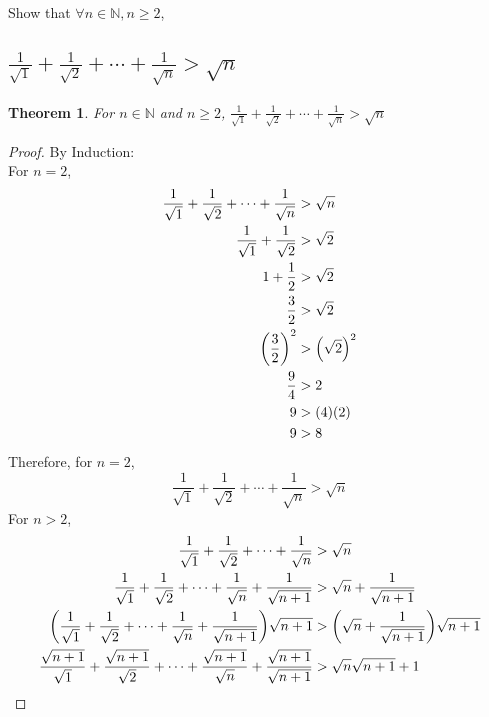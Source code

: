 \documentclass[]{article}
\newcommand{\N}{\mathbb{N}}
\newtheorem{theorem}{Theorem}
\begin{document}
\newpage
\section{}
Show that $\forall n \in \N, n \geq 2$,

\subsection{
    $\frac{1}{\sqrt{1}} + \frac{1}{\sqrt{2}} + \cdots + \frac{1}{\sqrt{n}} > \sqrt{n}$
}
\begin{theorem}
    For $n \in \N$ and $n \geq 2$,
    $\frac{1}{\sqrt{1}} + \frac{1}{\sqrt{2}} + \cdots + \frac{1}{\sqrt{n}} > \sqrt{n}$
\end{theorem}
\begin{proof}
    By Induction:\\
    For $n=2$,
    \begin{align*}
        \frac{1}{\sqrt{1}} + \frac{1}{\sqrt{2}} + \cdots + \frac{1}{\sqrt{n}} &> \sqrt{n}\\
        \frac{1}{\sqrt{1}} + \frac{1}{\sqrt{2}} &> \sqrt{2}\\
        1 + \frac{1}{2} &> \sqrt{2}\\
        \frac{3}{2} &> \sqrt{2}\\
        \qty(\frac{3}{2})^2 &> \qty(\sqrt{2})^2\\
        \frac{9}{4} &> 2\\
        9 &> (4)(2)\\
        9 &> 8 
    \end{align*}
    Therefore, for $n=2$,
    $$\frac{1}{\sqrt{1}} + \frac{1}{\sqrt{2}} + \cdots + \frac{1}{\sqrt{n}} > \sqrt{n}$$
    For $n>2$,
    \begin{align*}
        \frac{1}{\sqrt{1}} + \frac{1}{\sqrt{2}} + \cdots + \frac{1}{\sqrt{n}} 
            &> \sqrt{n}\\
        \frac{1}{\sqrt{1}} + \frac{1}{\sqrt{2}} + \cdots +
            \frac{1}{\sqrt{n}} + \frac{1}{\sqrt{n+1}}
            &> \sqrt{n} + \frac{1}{\sqrt{n+1}}\\
        \qty(\frac{1}{\sqrt{1}} + \frac{1}{\sqrt{2}} + \cdots +
            \frac{1}{\sqrt{n}} + \frac{1}{\sqrt{n+1}}) \sqrt{n+1}
            &> \qty(\sqrt{n} + \frac{1}{\sqrt{n+1}})\sqrt{n+1}\\
        \frac{\sqrt{n+1}}{\sqrt{1}} + \frac{\sqrt{n+1}}{\sqrt{2}} + \cdots + \frac{\sqrt{n+1}}{\sqrt{n}} + \frac{\sqrt{n+1}}{\sqrt{n+1}}
            &> \sqrt{n} \sqrt{n+1} + 1\\
    \end{align*}
\end{proof}
\end{document}
